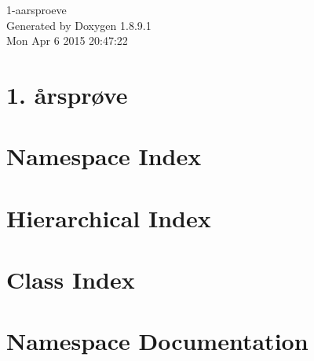 \documentclass[twoside]{book}
\newcommand{\+}{\discretionary{\mbox{\scriptsize$\hookleftarrow$}}{}{}}
\newcommand{\clearemptydoublepage}{%
  \newpage{\pagestyle{empty}\cleardoublepage}%
}
\begin{document}
\hypersetup{pageanchor=false,
             bookmarks=true,
             bookmarksnumbered=true,
             pdfencoding=unicode
            }
\begin{titlepage}
\vspace*{7cm}
\begin{center}%
{\Large 1-\/aarsproeve }\\
\vspace*{1cm}
{\large Generated by Doxygen 1.8.9.1}\\
\vspace*{0.5cm}
{\small Mon Apr 6 2015 20:47:22}\\
\end{center}
\end{titlepage}
\clearemptydoublepage
\tableofcontents
\clearemptydoublepage
{}
\hypersetup{pageanchor=true}

\chapter{1. årsprøve}
\label{md__documents__git_hub_1-aarsproeve__r_e_a_d_m_e}
\hypertarget{md__documents__git_hub_1-aarsproeve__r_e_a_d_m_e}{}

\chapter{Namespace Index}

\chapter{Hierarchical Index}

\chapter{Class Index}

\chapter{Namespace Documentation}












\end{document}
